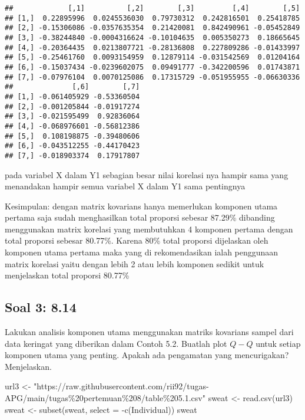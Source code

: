 \documentclass[
]{article}
\newenvironment{Shaded}{\begin{snugshade}}{\end{snugshade}}
\newcommand{\AttributeTok}[1]{\textcolor[rgb]{0.77,0.63,0.00}{#1}}
\newcommand{\FunctionTok}[1]{\textcolor[rgb]{0.00,0.00,0.00}{#1}}
\newcommand{\NormalTok}[1]{#1}
\newcommand{\OtherTok}[1]{\textcolor[rgb]{0.56,0.35,0.01}{#1}}
\newcommand{\SpecialCharTok}[1]{\textcolor[rgb]{0.00,0.00,0.00}{#1}}
\newcommand{\StringTok}[1]{\textcolor[rgb]{0.31,0.60,0.02}{#1}}
\begin{document}
\begin{verbatim}
##             [,1]          [,2]        [,3]         [,4]        [,5]
## [1,]  0.22895996  0.0245536030  0.79730312  0.242816501  0.25418785
## [2,] -0.15306086 -0.0357635354  0.21420081  0.842490961 -0.05452849
## [3,] -0.38244840 -0.0004316624 -0.10104635  0.005350273  0.18665645
## [4,] -0.20364435  0.0213807721 -0.28136808  0.227809286 -0.01433997
## [5,] -0.25461760  0.0093154959  0.12879114 -0.031542569  0.01204164
## [6,] -0.15037434 -0.0239602075  0.09491777 -0.342200596  0.01743871
## [7,] -0.07976104  0.0070125086  0.17315729 -0.051955955 -0.06630336
##              [,6]        [,7]
## [1,] -0.061405929 -0.53360504
## [2,] -0.001205844 -0.01917274
## [3,] -0.021595499  0.92836064
## [4,] -0.068976601 -0.56812386
## [5,]  0.108198875 -0.39480606
## [6,] -0.043512255 -0.44170423
## [7,] -0.018903374  0.17917807
\end{verbatim}

pada variabel X dalam Y1 sebagian besar nilai korelasi nya hampir sama
yang menandakan hampir semua variabel X dalam Y1 sama pentingnya

Kesimpulan: dengan matrix kovarians hanya memerlukan komponen utama
pertama saja sudah menghasilkan total proporsi sebesar 87.29\% dibanding
menggunakan matrix korelasi yang membutuhkan 4 komponen pertama dengan
total proporsi sebesar 80.77\%. Karena 80\% total proporsi dijelaskan
oleh komponen utama pertama maka yang di rekomendasikan ialah penggunaan
matrix korelasi yaitu dengan lebih 2 atau lebih komponen sedikit untuk
menjelaskan total proporsi 80.77\%

\hypertarget{soal-3-8.14}{%
\subsection{Soal 3: 8.14}\label{soal-3-8.14}}

Lakukan analisis komponen utama menggunakan matriks kovarians sampel
dari data keringat yang diberikan dalam Contoh 5.2. Buatlah plot \(Q-Q\)
untuk setiap komponen utama yang penting. Apakah ada pengamatan yang
mencurigakan? Menjelaskan.

\begin{Shaded}
\begin{Highlighting}[]
\NormalTok{url3 }\OtherTok{\textless{}{-}} \StringTok{"https://raw.githubusercontent.com/rii92/tugas{-}APG/main/tugas\%20pertemuan\%208/table\%205.1.csv"}
\NormalTok{sweat }\OtherTok{\textless{}{-}} \FunctionTok{read.csv}\NormalTok{(url3)}
\NormalTok{sweat }\OtherTok{\textless{}{-}} \FunctionTok{subset}\NormalTok{(sweat, }\AttributeTok{select =} \SpecialCharTok{{-}}\FunctionTok{c}\NormalTok{(Individual))}
\NormalTok{sweat}
\end{Highlighting}
\end{Shaded}
\end{document}
